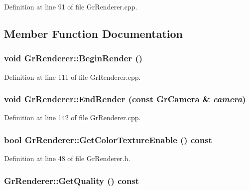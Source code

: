 Definition at line 91 of file GrRenderer.cpp.

\subsection{Member Function Documentation}
\hypertarget{class_gr_renderer_b9f9a038981e6e4f3de7069202759fdf}{
\subsubsection[{BeginRender}]{\setlength{\rightskip}{0pt plus 5cm}void GrRenderer::BeginRender ()}}
\label{class_gr_renderer_b9f9a038981e6e4f3de7069202759fdf}




Definition at line 111 of file GrRenderer.cpp.\hypertarget{class_gr_renderer_3e1dbac87b12049ca2e0341662ebc8a6}{
\subsubsection[{EndRender}]{\setlength{\rightskip}{0pt plus 5cm}void GrRenderer::EndRender (const {\bf GrCamera} \& {\em camera})}}
\label{class_gr_renderer_3e1dbac87b12049ca2e0341662ebc8a6}




Definition at line 142 of file GrRenderer.cpp.\hypertarget{class_gr_renderer_d05a7dc01a5500bb3b2a0b0bdd491a36}{
\subsubsection[{GetColorTextureEnable}]{\setlength{\rightskip}{0pt plus 5cm}bool GrRenderer::GetColorTextureEnable () const}}
\label{class_gr_renderer_d05a7dc01a5500bb3b2a0b0bdd491a36}




Definition at line 48 of file GrRenderer.h.\hypertarget{class_gr_renderer_d86b7160c1b0831ec0ddc4a721b433f0}{
\subsubsection[{GetQuality}]{ GrRenderer::GetQuality () const}}
\label{class_gr_renderer_d86b7160c1b0831ec0ddc4a721b433f0}




